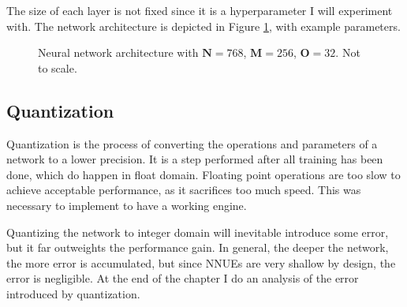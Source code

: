 The size of each layer is not fixed since it is a hyperparameter I will experiment with. The network architecture is depicted in Figure \ref{fig:network}, with example parameters.

\begin{figure}[H]
\centering
{}
\caption{Neural network architecture with $\bm{N}=768$, $\bm{M}=256$, $\bm{O}=32$. Not to scale.}
\label{fig:network}
\end{figure}

\subsection{Quantization}


Quantization is the process of converting the operations and parameters of a network to a lower precision. It is a step performed after all training has been done, which do happen in float domain. Floating point operations are too slow to achieve acceptable performance, as it sacrifices too much speed. This was necessary to implement to have a working engine.

Quantizing the network to integer domain will inevitable introduce some error, but it far outweights the performance gain. In general, the deeper the network, the more error is accumulated, but since NNUEs are very shallow by design, the error is negligible. At the end of the chapter I do an analysis of the error introduced by quantization.

